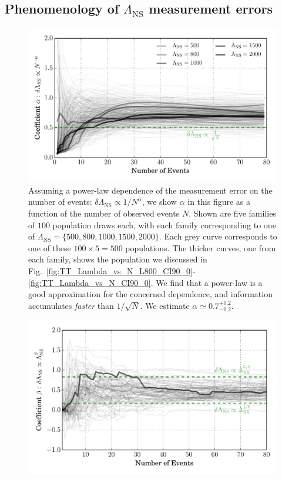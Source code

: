 \documentclass[aps,prd,amsmath,floats,floatfix, twocolumn,
superscriptaddress,nofootinbib,showpacs]{revtex4-1}
\newcommand{\lambdans}{\Lambda_\mathrm{NS}}
\begin{document}
\begin{appendix}
\section{Phenomenology of $\lambdans$ measurement errors}
% 
\begin{figure}
\centering    
\includegraphics[width=1.05\columnwidth]{plots/PowerLawCoefficient_LambdaErrorvsN_vs_N.pdf}
\caption{%
Assuming a power-law dependence of the measurement error on the number of
events: $\delta\lambdans\propto 1/N^\alpha$, we show $\alpha$ in this figure
as a function of the number of observed events $N$. Shown are five families
of $100$ population draws each, with each family corresponding to one of
$\lambdans=\{500,800,1000,1500,2000\}$. Each grey curve corresponds to one
of these $100\times5 = 500$ populations. The thicker curves, one from each
family, shows the population we discussed in
Fig.~\ref{fig:TT_Lambda_vs_N_L800_CI90_0}-\ref{fig:TT_Lambda_vs_N_CI90_0}.
We find that a power-law is a good approximation for the concerned dependence,
and information accumulates {\it faster} than $1/\sqrt{N}$. We estimate
$\alpha\simeq 0.7^{+0.2}_{-0.2}$.
}
\label{fig:TT_PowerLawLambdaErrorVsN}
\end{figure}
%
% 
\begin{figure}
\centering    
\includegraphics[width=\columnwidth]{plots/PowerLawCoefficient_LambdaErrorvsLambda_vs_N_AllPopulations.pdf}

\end{figure}
\end{appendix}
\end{document}
